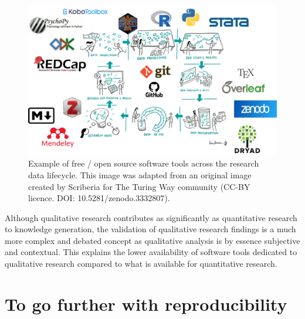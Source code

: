 \documentclass[
  letterpaper,
  DIV=11,
  numbers=noendperiod,
  oneside]{scrreprt}
\begin{document}
\begin{figure}

{\centering \includegraphics{./images/paste-AF117E41.png}

}

\caption{\label{fig-software-tools-across-research-lifecycle}Example of
free / open source software tools across the research data lifecycle.
This image was adapted from an original image created by Scriberia for
The Turing Way community (CC-BY licence. DOI: 10.5281/zenodo.3332807).}

\end{figure}

\begin{tcolorbox}[enhanced jigsaw, colbacktitle=quarto-callout-note-color!10!white, titlerule=0mm, breakable, opacityback=0, opacitybacktitle=0.6, left=2mm, coltitle=black, colback=white, title=\textcolor{quarto-callout-note-color}{\faInfo}\hspace{0.5em}{Note}, rightrule=.15mm, colframe=quarto-callout-note-color-frame, toprule=.15mm, bottomtitle=1mm, toptitle=1mm, arc=.35mm, bottomrule=.15mm, leftrule=.75mm]
Although qualitative research contributes as significantly as
quantitative research to knowledge generation, the validation of
qualitative research findings is a much more complex and debated concept
as qualitative analysis is by essence subjective and contextual. This
explains the lower availability of software tools dedicated to
qualitative research compared to what is available for quantitative
research.
\end{tcolorbox}

\hypertarget{to-go-further-with-reproducibility}{%
\section{To go further with
reproducibility}\label{to-go-further-with-reproducibility}}
\end{document}
